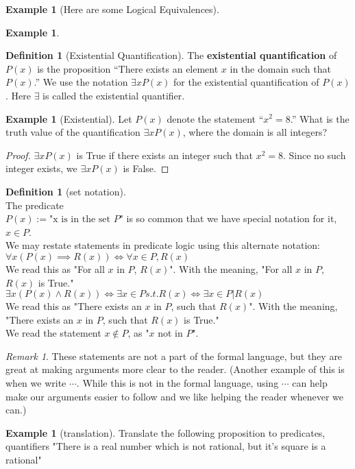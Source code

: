 \documentclass[letterpaper,10pt]{article}
\theoremstyle{plain}
\theoremstyle{definition}
\newtheorem{defn}[thm]{Definition}
\newtheorem{exmp}[thm]{Example}
\theoremstyle{remark}
\newtheorem{rem}[thm]{Remark}
\providecommand{\land}{\ensuremath{\wedge}}
\begin{document}
\begin{exmp}[Here are some Logical Equivalences]
\begin{exmp}
\vspace{2cm}
\end{exmp}
\begin{defn}[Existential Quantification]
The \textbf{existential quantification} of $P(x)$ is the proposition
“There exists an element $x$ in the domain such that $P(x)$.”
We use the notation $\exists xP(x)$ for the existential quantification of $P(x)$. Here $\exists$ is called the
existential quantifier.
\end{defn}
\begin{exmp}[Existential]
Let $P(x)$ denote the statement “$x^2 = 8 $.” What is the truth value of the quantification $\exists xP(x)$,
where the domain is all integers?
\begin{proof}
$\exists x P(x)$ is True if there exists an integer such that $x^2=8$. Since no such integer exists, we $\exists x P(x)$ is False.
\end{proof}
\end{exmp}
\begin{defn}[set notation] \ \\
The predicate
\\
$P(x):= \text{"x is in the set $P$"}$ is so common that we have special notation for it, $x \in P$.
\\
We may restate statements in predicate logic using this alternate notation:
\\
$\forall x (P(x) \implies R(x))\iff \forall x \in P, R(x)$
\\
We read this as "For all $x$ in $P$, $R(x)$". With the meaning, "For all $x$ in $P$, $R(x)$ is True."
\\
$\exists x (P(x) \land  R(x))\iff \exists x \in P s.t. R(x)\iff \exists x \in P | R(x)$
\\
We read this as "There exists an $x$ in $P$, such that $R(x)$". With the meaning, "There exists an $x$ in $P$, such that $R(x)$ is True."
\\
We read the statement $x\notin P$, as "$x$ not in $P$".
\end{defn}
\begin{rem}
These statements are not a part of the formal language, but they are great at making arguments  more clear to the reader. (Another example of this is when we write $\cdots$. While this is not in the formal language, using $\cdots$ can help make our arguments easier to follow and we like helping the reader whenever we can.)
\end{rem}
\begin{exmp}[translation]
Translate the following proposition to predicates, quantifiers
"There is a real number which is not rational, but it's square is a rational"


\end{exmp}
\end{exmp}
\end{document}
